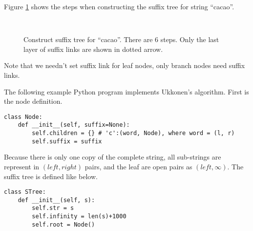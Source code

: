 \documentclass[UTF8]{article}
\begin{document}
Figure \ref{fig:cons-stree-cacao} shows the steps when constructing the
suffix tree for string ``cacao''.

\begin{figure}[htbp]
  \centering
   \\
  \caption{Construct suffix tree for ``cacao''. There are 6 steps. Only the last layer of suffix links are shown in dotted arrow.}
  \label{fig:cons-stree-cacao}
\end{figure}

Note that we needn't set suffix link for leaf nodes, only branch nodes
need suffix links.

The following example Python program implements Ukkonen's algorithm.
First is the node definition.

\lstset{language=Python}
\begin{lstlisting}
class Node:
    def __init__(self, suffix=None):
        self.children = {} # 'c':(word, Node), where word = (l, r)
        self.suffix = suffix
\end{lstlisting}

Because there is only one copy of the complete string, all sub-strings
are represent in $(left, right)$ pairs, and the leaf are open pairs
as $(left, \infty)$. The suffix tree is defined like below.

\begin{lstlisting}
class STree:
    def __init__(self, s):
        self.str = s
        self.infinity = len(s)+1000
        self.root = Node()
\end{lstlisting}
\end{document}

